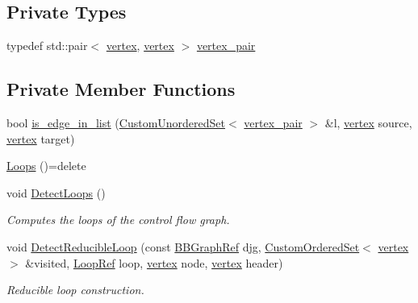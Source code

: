 \subsection*{Private Types}
\begin{DoxyCompactItemize}
\item 
typedef std\+::pair$<$ \hyperlink{graph_8hpp_abefdcf0544e601805af44eca032cca14}{vertex}, \hyperlink{graph_8hpp_abefdcf0544e601805af44eca032cca14}{vertex} $>$ \hyperlink{classLoops_a0128208bc6f5092dcd97a7f2e75b168c}{vertex\+\_\+pair}
\end{DoxyCompactItemize}
\subsection*{Private Member Functions}
\begin{DoxyCompactItemize}
\item 
bool \hyperlink{classLoops_ac022f2714ff16a787ea9e609616e7f9d}{is\+\_\+edge\+\_\+in\+\_\+list} (\hyperlink{classCustomUnorderedSet}{Custom\+Unordered\+Set}$<$ \hyperlink{classLoops_a0128208bc6f5092dcd97a7f2e75b168c}{vertex\+\_\+pair} $>$ \&l, \hyperlink{graph_8hpp_abefdcf0544e601805af44eca032cca14}{vertex} source, \hyperlink{graph_8hpp_abefdcf0544e601805af44eca032cca14}{vertex} target)
\item 
\hyperlink{classLoops_a76c8286bf419d2b56d704f73d8b9afa6}{Loops} ()=delete
\item 
void \hyperlink{classLoops_ab4e1b49b594312ae244e75093833b672}{Detect\+Loops} ()
\begin{DoxyCompactList}\small\item\em Computes the loops of the control flow graph. \end{DoxyCompactList}\item 
void \hyperlink{classLoops_a2da630bd46322a13de6b01c173dd708e}{Detect\+Reducible\+Loop} (const \hyperlink{basic__block_8hpp_a0e7f233d1b83cad0bfd5aa865f0d3532}{B\+B\+Graph\+Ref} djg, \hyperlink{classCustomOrderedSet}{Custom\+Ordered\+Set}$<$ \hyperlink{graph_8hpp_abefdcf0544e601805af44eca032cca14}{vertex} $>$ \&visited, \hyperlink{loop_8hpp_aa4a60313089619376f67557c4120423c}{Loop\+Ref} loop, \hyperlink{graph_8hpp_abefdcf0544e601805af44eca032cca14}{vertex} node, \hyperlink{graph_8hpp_abefdcf0544e601805af44eca032cca14}{vertex} header)
\begin{DoxyCompactList}\small\item\em Reducible loop construction. \end{DoxyCompactList}\item 

\end{DoxyCompactItemize}
